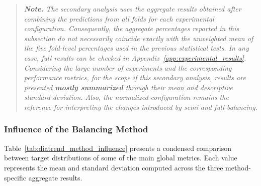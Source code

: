\begin{quote}
\small
\textit{\textbf{Note.} The secondary analysis uses the aggregate results obtained after combining the predictions from all folds for each experimental configuration. Consequently, the aggregate percentages reported in this subsection do not necessarily coincide exactly with the unweighted mean of the five fold-level percentages used in the previous statistical tests. In any case, full results can be checked in Appendix~\ref{app:experimental_results}. Considering the large number of experiments and the corresponding performance metrics, for the scope if this secondary analysis, results are presented \textbf{mostly summarized} through their mean and descriptive standard deviation. Also, the normalized configuration remains the reference for interpreting the changes introduced by semi and full-balancing.}
\end{quote}

\subsubsection{Influence of the Balancing Method}
\label{subsubsec:diatrend_method_influence}

Table~\ref{tab:diatrend_method_influence} presents a condensed comparison between target distributions of some of the main global metrics. Each value represents the mean and standard deviation computed across the three method-specific aggregate results.

\begin{table}[htbp]
    \centering
    \caption{Main DiaTrend results.}
    \label{tab:diatrend_method_influence}
\end{table}

